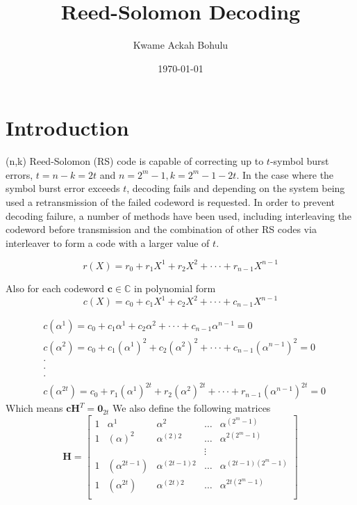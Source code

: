\documentclass[fontsize=12pt]{article}
\title{Reed-Solomon Decoding}
\author{Kwame Ackah Bohulu}
\date{\today}
\begin{document}
\maketitle

\newpage
\section{Introduction}
 (n,k) Reed-Solomon (RS) code is capable of correcting up to $t$-symbol burst errors, $t=n-k=2t$
 and $n=2^m-1, k=2^m-1-2t$.
 In the case where the symbol burst error exceeds $t$, decoding fails and depending on the system being used a retransmission of the failed codeword is requested.
In order to prevent decoding failure, a number of methods have been used, including interleaving the codeword before transmission and the combination of other RS codes via interleaver to form a code with a larger value of $t$.

\begin{equation}
r(X)=r_0+r_1X^1+r_2X^2+\cdot\cdot\cdot+r_{n-1}X^{n-1}
\label{1}
\end{equation}

Also for each codeword $\mathbf{c} \in \mathbb{C}$ in polynomial form
\begin{equation}
c(X)=c_0+c_1X^1+c_2X^2+\cdot\cdot\cdot+c_{n-1}X^{n-1}
\end{equation}

\begin{equation}
\begin{split}
&c(\alpha^{1})=c_0+c_1\alpha^1+c_2\alpha^2+\cdot\cdot\cdot+c_{n-1}\alpha^{n-1}=0\\
&c(\alpha^{2})=c_0+c_1(\alpha^1)^2+c_2(\alpha^2)^2+\cdot\cdot\cdot+c_{n-1}(\alpha^{n-1})^2=0\\
&\cdot\\
  &\cdot\\
   &\cdot\\
&c(\alpha^{2t})=c_0+r_1(\alpha^1)^{2t}+r_2(\alpha^2)^{2t}+\cdot\cdot\cdot+r_{n-1}(\alpha^{n-1})^{2t}=0
\end{split}
\label{2}
\end{equation}
Which means $\mathbf{c}\mathbf{H}^T=\mathbf{0}_{2t}$
We also define the following matrices
\begin{equation}
\mathbf{H}=
\begin{bmatrix}
    1       &  \alpha^{1}  &  \alpha^{2}  & \dots &  \alpha^{(2^m-1)}  \\
    1      &  ( \alpha )^2 &   \alpha^{(2)2}  & \dots &  \alpha^{2(2^m-1)}  \\
    &&&\vdots{} \\
    1       &  (\alpha^{2t-1}) & \alpha^{(2t-1)2}  & \dots &  \alpha^{(2t-1)(2^m-1)}  \\
    1       &  ( \alpha^{2t} ) &  \alpha^{(2t)2}  & \dots &  \alpha^{2t(2^m-1)}  \\
\end{bmatrix}
\end{equation}
\end{document}
